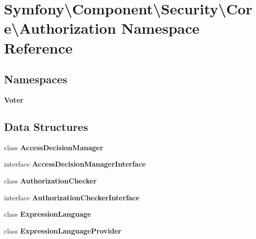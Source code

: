 \section{Symfony\textbackslash{}Component\textbackslash{}Security\textbackslash{}Core\textbackslash{}Authorization Namespace Reference}
\label{namespace_symfony_1_1_component_1_1_security_1_1_core_1_1_authorization}
\subsection*{Namespaces}
\begin{DoxyCompactItemize}
\item 
 {\bf Voter}
\end{DoxyCompactItemize}
\subsection*{Data Structures}
\begin{DoxyCompactItemize}
\item 
class {\bf Access\+Decision\+Manager}
\item 
interface {\bf Access\+Decision\+Manager\+Interface}
\item 
class {\bf Authorization\+Checker}
\item 
interface {\bf Authorization\+Checker\+Interface}
\item 
class {\bf Expression\+Language}
\item 
class {\bf Expression\+Language\+Provider}
\end{DoxyCompactItemize}

